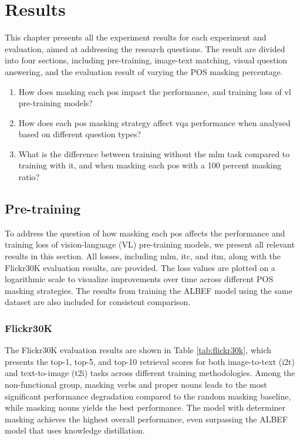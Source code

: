 \chapter{Results}
This chapter presents all the experiment results for each experiment and evaluation, aimed at addressing the research questions.
The result are divided into four sections, including pre-training, image-text matching, visual question answering, and the evaluation result of varying the POS masking percentage.
\begin{enumerate}  
    \item How does masking each \acrshort{pos} impact the performance, and training loss of \acrshort{vl} pre-training models?  
    \item How does each \acrshort{pos} masking strategy affect \acrfull{vqa} performance when analysed based on different question types?  
    \item What is the difference between training without the \acrshort{mlm} task compared to training with it, and when masking each \acrshort{pos} with a 100 percent masking ratio?  
\end{enumerate}

\section{Pre-training}
To address the question of how masking each \acrshort{pos} affects the performance and training loss of vision-language (VL) pre-training models, we present all relevant results in this section.  
All losses, including \acrshort{mlm}, \acrshort{itc}, and \acrshort{itm}, along with the Flickr30K evaluation results, are provided.  
The loss values are plotted on a logarithmic scale to visualize improvements over time across different POS masking strategies.  
The results from training the ALBEF model using the same dataset are also included for consistent comparison.

\subsection{Flickr30K}
The Flickr30K evaluation results are shown in Table \ref{tab:flickr30k}, which presents the top-1, top-5, and top-10 retrieval scores for both image-to-text (i2t) and text-to-image (t2i) tasks across different training methodologies.  
Among the non-functional group, masking verbs and proper nouns leads to the most significant performance degradation compared to the random masking baseline, while masking nouns yields the best performance.  
The model with determiner masking achieves the highest overall performance, even surpassing the ALBEF model that uses knowledge distillation.

